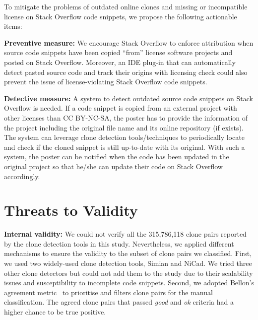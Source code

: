 \documentclass[sigconf,review, anonymous]{acmart}
\begin{document}
To mitigate the problems of outdated online clones and missing or incompatible license on Stack Overflow code snippets, we propose the following actionable items: 

\textbf{Preventive measure:} We encourage Stack Overflow to enforce attribution when source code snippets have been copied ``from'' license software projects and posted on Stack Overflow. Moreover, an IDE plug-in that can automatically detect pasted source code and track their origins with licensing check could also prevent the issue of license-violating Stack Overflow code snippets.

\textbf{Detective measure:} A system to detect outdated source code snippets on Stack Overflow is needed. If a code snippet is copied from an external project with other licenses than CC BY-NC-SA, the poster has to provide the information of the project including the original file name and its online repository (if exists). The system can leverage clone detection tools/techniques to periodically locate and check if the cloned snippet is still up-to-date with its original. With such a system, the poster can be notified when the code has been updated in the original project so that he/she can update their code on Stack Overflow accordingly.

\section{Threats to Validity}

\textbf{Internal validity:} 
%
We could not verify all the 315,786,118 clone pairs reported by the
clone detection tools in this study.  Nevertheless, we applied
different mechanisms to ensure the validity to the subset of clone
pairs we classified.  First, we used two widely-used
clone detection tools, Simian and NiCad.  We tried three other
clone detectors but could not add them to the study due to their
scalability issues and susceptibility to incomplete code snippets.
Second, we adopted Bellon's agreement metric~\cite{Bellon2007}
to prioritise and filters clone pairs for the manual
classification. The agreed clone pairs that passed \textit{good} and
\textit{ok} criteria had a higher chance to be true positive. 
\end{document}
